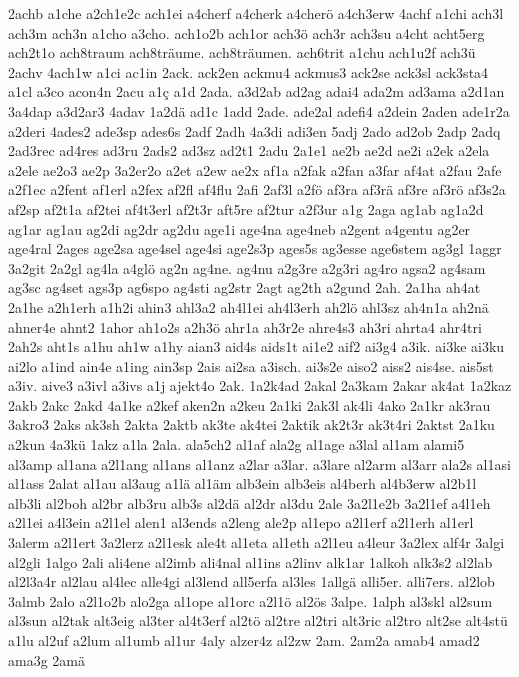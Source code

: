 {2achb
a1che
a2ch1e2c
ach1ei
a4cherf
a4cherk
a4cherö
a4ch3erw
4achf
a1chi
ach3l
ach3m
ach3n
a1cho
a3cho.
ach1o2b
ach1or
ach3ö
ach3r
ach3su
a4cht
acht5erg
ach2t1o
ach8traum
ach8träume.
ach8träumen.
ach6trit
a1chu
ach1u2f
ach3ü
2achv
4ach1w
a1ci
ac1in
2ack.
ack2en
ackmu4
ackmus3
ack2se
ack3sl
ack3sta4
a1cl
a3co
acon4n
2acu
a1ç
a1d
2ada.
a3d2ab
ad2ag
adai4
ada2m
ad3ama
a2d1an
3a4dap
a3d2ar3
4adav
1a2dä
ad1c
1add
2ade.
ade2al
adefi4
a2dein
2aden
ade1r2a
a2deri
4ades2
ade3sp
ades6s
2adf
2adh
4a3di
adi3en
5adj
2ado
ad2ob
2adp
2adq
2ad3rec
ad4res
ad3ru
2ads2
ad3sz
ad2t1
2adu
2a1e1
ae2b
ae2d
ae2i
a2ek
a2ela
a2ele
ae2o3
ae2p
3a2er2o
a2et
a2ew
ae2x
af1a
a2fak
a2fan
a3far
af4at
a2fau
2afe
a2f1ec
a2fent
af1erl
a2fex
af2fl
af4flu
2afi
2af3l
a2fö
af3ra
af3rä
af3re
af3rö
af3s2a
af2sp
af2t1a
af2tei
af4t3erl
af2t3r
aft5re
af2tur
a2f3ur
a1g
2aga
ag1ab
ag1a2d
ag1ar
ag1au
ag2di
ag2dr
ag2du
age1i
age4na
age4neb
a2gent
a4gentu
ag2er
age4ral
2ages
age2sa
age4sel
age4si
age2s3p
ages5s
ag3esse
age6stem
ag3gl
1aggr
3a2git
2a2gl
ag4la
a4glö
ag2n
ag4ne.
ag4nu
a2g3re
a2g3ri
ag4ro
agsa2
ag4sam
ag3sc
ag4set
ags3p
ag6spo
ag4sti
ag2str
2agt
ag2th
a2gund
2ah.
2a1ha
ah4at
2a1he
a2h1erh
a1h2i
ahin3
ahl3a2
ah4l1ei
ah4l3erh
ah2lö
ahl3sz
ah4n1a
ah2nä
ahner4e
ahnt2
1ahor
ah1o2s
a2h3ö
ahr1a
ah3r2e
ahre4s3
ah3ri
ahrta4
ahr4tri
2ah2s
aht1s
a1hu
ah1w
a1hy
aian3
aid4s
aids1t
ai1e2
aif2
ai3g4
a3ik.
ai3ke
ai3ku
ai2lo
a1ind
ain4e
a1ing
ain3sp
2ais
ai2sa
a3isch.
ai3s2e
aiso2
aiss2
ais4se.
ais5st
a3iv.
aive3
a3ivl
a3ivs
a1j
ajekt4o
2ak.
1a2k4ad
2akal
2a3kam
2akar
ak4at
1a2kaz
2akb
2akc
2akd
4a1ke
a2kef
aken2n
a2keu
2a1ki
2ak3l
ak4li
4ako
2a1kr
ak3rau
3akro3
2aks
ak3sh
2akta
2aktb
ak3te
ak4tei
2aktik
ak2t3r
ak3t4ri
2aktst
2a1ku
a2kun
4a3kü
1akz
a1la
2ala.
ala5ch2
al1af
ala2g
al1age
a3lal
al1am
alami5
al3amp
al1ana
a2l1ang
al1ans
al1anz
a2lar
a3lar.
a3lare
al2arm
al3arr
ala2s
al1asi
al1ass
2alat
al1au
al3aug
a1lä
al1äm
alb3ein
alb3eis
al4berh
al4b3erw
al2b1l
alb3li
al2boh
al2br
alb3ru
alb3s
al2dä
al2dr
al3du
2ale
3a2l1e2b
3a2l1ef
a4l1eh
a2l1ei
a4l3ein
a2l1el
alen1
al3ends
a2leng
ale2p
al1epo
a2l1erf
a2l1erh
al1erl
3alerm
a2l1ert
3a2lerz
a2l1esk
ale4t
al1eta
al1eth
a2l1eu
a4leur
3a2lex
alf4r
3algi
al2gli
1algo
2ali
ali4ene
al2imb
ali4nal
al1ins
a2linv
alk1ar
1alkoh
alk3s2
al2lab
al2l3a4r
al2lau
al4lec
alle4gi
al3lend
all5erfa
al3les
1allgä
alli5er.
alli7ers.
al2lob
3almb
2alo
a2l1o2b
alo2ga
al1ope
al1orc
a2l1ö
al2ös
3alpe.
1alph
al3skl
al2sum
al3sun
al2tak
alt3eig
al3ter
al4t3erf
al2tö
al2tre
al2tri
alt3ric
al2tro
alt2se
alt4stü
a1lu
al2uf
a2lum
al1umb
al1ur
4aly
alzer4z
al2zw
2am.
2am2a
amab4
amad2
ama3g
2amä
}
